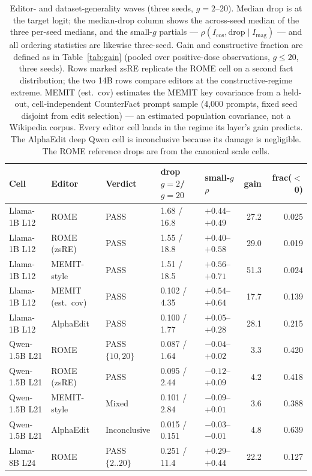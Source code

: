 \documentclass[preprint,12pt]{elsarticle}
\theoremstyle{definition}
\begin{document}
\begin{table}[htbp]
\centering
\caption{Editor- and dataset-generality waves (three seeds, $g{=}2$--20). Median drop is
at the target logit; the median-drop column shows the across-seed median of the three
per-seed medians, and the small-$g$ partials --- $\rho(I_{\cos},\mathrm{drop}\mid
I_{\mathrm{mag}})$ --- and all ordering statistics are likewise three-seed. Gain and constructive
fraction are defined as in Table~\ref{tab:gain} (pooled over positive-dose observations,
$g\leq20$, three seeds). Rows marked zsRE replicate the ROME cell on a second fact
distribution; the two 14B rows compare editors at the constructive-regime extreme.
MEMIT (est.\ cov) estimates the MEMIT key covariance from a held-out, cell-independent
CounterFact prompt sample (4{,}000 prompts, fixed seed disjoint from edit selection) ---
an estimated population covariance, not a Wikipedia corpus. Every
editor cell lands in the regime its layer's gain predicts. The AlphaEdit deep Qwen cell
is inconclusive because its damage is negligible. The ROME reference drops are from the
canonical scale cells.}
\label{tab:editors}
{\scriptsize
\setlength{\tabcolsep}{3pt}
\begin{tabular}{lllllrr}
\toprule
Cell & Editor & Verdict & drop $g{=}2$/$g{=}20$ & small-$g$ $\rho$ & gain & frac($<$0) \\
\midrule
Llama-1B L12 & ROME          & PASS & 1.68 / 16.8 & $+0.44$--$+0.49$ & 27.2 & 0.025 \\
Llama-1B L12 & ROME (zsRE)   & PASS & 1.55 / 18.8 & $+0.40$--$+0.58$ & 29.0 & 0.019 \\
Llama-1B L12 & MEMIT-style   & PASS & 1.51 / 18.5 & $+0.56$--$+0.71$ & 51.3 & 0.024 \\
Llama-1B L12 & MEMIT (est.\ cov) & PASS & 0.102 / 4.35 & $+0.54$--$+0.64$ & 17.7 & 0.139 \\
Llama-1B L12 & AlphaEdit     & PASS & 0.100 / 1.77 & $+0.05$--$+0.28$ & 28.1 & 0.215 \\
Qwen-1.5B L21 & ROME         & PASS $\{10,20\}$ & 0.087 / 1.64 & $-0.04$--$+0.02$ & 3.3 & 0.420 \\
Qwen-1.5B L21 & ROME (zsRE)  & PASS & 0.095 / 2.44 & $-0.12$--$+0.09$ & 4.2 & 0.418 \\
Qwen-1.5B L21 & MEMIT-style  & Mixed & 0.101 / 2.84 & $-0.09$--$+0.01$ & 3.6 & 0.388 \\
Qwen-1.5B L21 & AlphaEdit    & Inconclusive & 0.015 / 0.151 & $-0.03$--$-0.01$ & 4.8 & 0.639 \\
Llama-8B L24 & ROME          & PASS $\{2..20\}$ & 0.251 / 11.4 & $+0.29$--$+0.44$ & 22.2 & 0.127 \\

\end{tabular}}
\end{table}
\end{document}
